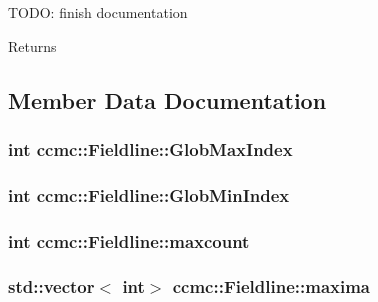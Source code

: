 T\-O\-D\-O\-: finish documentation \begin{DoxyReturn}{Returns}

\end{DoxyReturn}


\subsection{Member Data Documentation}
\hypertarget{classccmc_1_1_fieldline_ab4a42e2d2703418d4d0913ea279e89c1}{
\subsubsection[{Glob\-Max\-Index}]{\setlength{\rightskip}{0pt plus 5cm}int ccmc\-::\-Fieldline\-::\-Glob\-Max\-Index}}\label{classccmc_1_1_fieldline_ab4a42e2d2703418d4d0913ea279e89c1}
\hypertarget{classccmc_1_1_fieldline_a99172cf16d46b155773983b2bfd043dd}{
\subsubsection[{Glob\-Min\-Index}]{\setlength{\rightskip}{0pt plus 5cm}int ccmc\-::\-Fieldline\-::\-Glob\-Min\-Index}}\label{classccmc_1_1_fieldline_a99172cf16d46b155773983b2bfd043dd}
\hypertarget{classccmc_1_1_fieldline_a0d3ae25b1357cec44c7207eb8ecc670d}{
\subsubsection[{maxcount}]{\setlength{\rightskip}{0pt plus 5cm}int ccmc\-::\-Fieldline\-::maxcount}}\label{classccmc_1_1_fieldline_a0d3ae25b1357cec44c7207eb8ecc670d}
\hypertarget{classccmc_1_1_fieldline_afa83761b48fc8782b6bd74a3109881b1}{
\subsubsection[{maxima}]{\setlength{\rightskip}{0pt plus 5cm}std\-::vector$<$ int$>$ ccmc\-::\-Fieldline\-::maxima}}\label{classccmc_1_1_fieldline_afa83761b48fc8782b6bd74a3109881b1}
